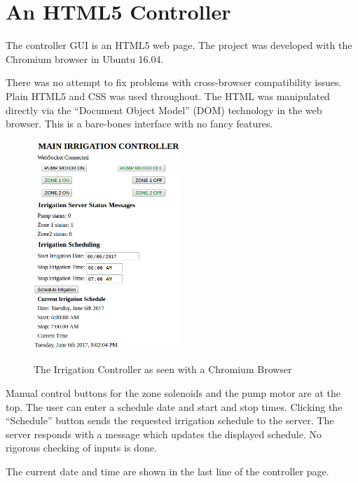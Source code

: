 %
%
%

\chapter{An HTML5 Controller}

The controller GUI is an HTML5 web page.  The project was developed with the 
Chromium browser in Ubuntu 16.04.

There was no attempt to fix problems with cross-browser compatibility issues.  
Plain HTML5 and CSS was used throughout.  The HTML was manipulated directly via 
the ``Document Object Model'' (DOM) technology in the web browser.  This is a 
bare-bones interface with no fancy features.


\begin{figure}[h]
	\centering
    \includegraphics[width=0.5\textwidth]{photos/browser_full.png}
	\centering\bfseries
	\caption{The Irrigation Controller as seen with a Chromium Browser}
\end{figure}

Manual control buttons for the zone solenoids and the pump motor are at the 
top.  The user can enter a schedule date and start and stop times.  Clicking 
the ``Schedule'' button sends the requested irrigation schedule to the server.  
The server responds with a message which updates the displayed schedule.  No 
rigorous checking of inputs is done.

The current date and time  are shown in the last line of the controller page.

